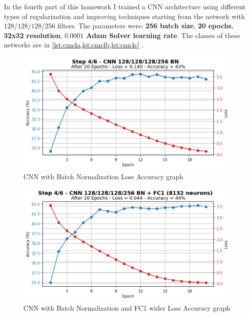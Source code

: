 \documentclass[a4paper, 11pt]{article}
\begin{document}
	In the fourth part of this homework I trained a CNN architecture using different types of regularization and improving techniques starting from the network with $128$/$128$/$128$/$256$ filters. The parameters were: \textbf{256 batch size}, \textbf{20 epochs}, \textbf{32x32 resolution}, \textbf{$\boldsymbol{0.0001}$ Adam Solver learning rate}. The classes of these networks are in \vref{lst:cnn4a,lst:cnn4b,lst:cnn4c} .
	\begin{figure}[ht!]
		\centering
		\includegraphics[width=0.62\paperwidth]{img/fig04a.png}
		\caption{CNN with Batch Normalization Loss Accuracy graph}
		\label{fig:04a}
	\end{figure}
	\begin{figure}[ht!]
		\centering
		\includegraphics[width=0.62\paperwidth]{img/fig04b.png}
		\caption{CNN with Batch Normalization and FC1 wider Loss Accuracy graph}
		\label{fig:04b}
	\end{figure}
\end{document}
